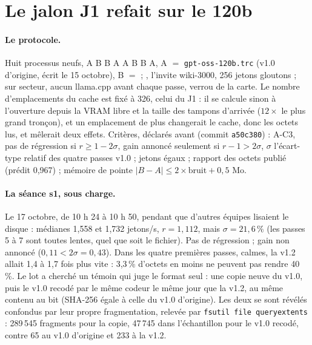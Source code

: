\section{Le jalon J1 refait sur le 120b}\label{t3cod:sec:j1}

\paragraph{Le protocole.} Huit processus neufs, A B B A A B B A, A $=$ \texttt{gpt-oss-120b.trc} (v1.0 d'origine, écrit le 15 octobre), B $=$  ; , l'invite wiki-3000, 256 jetons gloutons ; sur secteur, aucun llama.cpp avant chaque passe, verrou de la carte. Le nombre d'emplacements du cache est fixé à 326, celui du J1 : il se calcule sinon à l'ouverture depuis la VRAM libre et la taille des tampons d'arrivée ($12 \times$ le plus grand tronçon), et un emplacement de plus changerait le cache, donc les octets lus, et mêlerait deux effets. Critères, déclarés avant (commit \texttt{a50c380}) : A-C3, pas de régression si $r \ge 1 - 2\sigma$, gain annoncé seulement si $r - 1 > 2\sigma$, $\sigma$ l'écart-type relatif des quatre passes v1.0 ; jetons égaux ; rapport des octets publié (prédit 0,967) ; mémoire de pointe $|B - A| \le 2 \times \text{bruit} + 0{,}5$ Mo.

\paragraph{La séance s1, sous charge.} Le 17 octobre, de 10 h 24 à 10 h 50, pendant que d'autres équipes lisaient le disque : médianes 1,558 et 1,732 jetons/s, $r = 1{,}112$, mais $\sigma = 21{,}6\,\%$ (les passes 5 à 7 sont toutes lentes, quel que soit le fichier). Pas de régression ; gain non annoncé ($0{,}11 < 2\sigma = 0{,}43$). Dans les quatre premières passes, calmes, la v1.2 allait 1,4 à 1,7 fois plus vite : 3,3\,\% d'octets en moins ne peuvent pas rendre 40\,\%. Le lot a cherché un témoin qui juge le format seul : une copie neuve du v1.0, puis le v1.0 recodé par le même codeur le même jour que la v1.2, au même contenu au bit (SHA-256 égale à celle du v1.0 d'origine). Les deux se sont révélés confondus par leur propre fragmentation, relevée par \texttt{fsutil file queryextents} \parencite{ms2018retrievalpointers} : 289\,545 fragments pour la copie, 47\,745 dans l'échantillon pour le v1.0 recodé, contre 65 au v1.0 d'origine et 233 à la v1.2.

